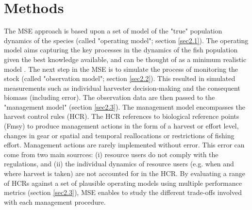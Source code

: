 \documentclass[12pt,oneline,a4paper,numbib]{ouparticle}
\numberwithin{equation}{subsection} %
\begin{document}
\section{Methods}
\label{sec2}
The MSE approach is based upon a set of model of the "true" population dynamics of the species (called "operating model"; section \ref{sec2.1}). The operating model aims capturing the key processes in the dynamics of the fish population given the best knowledge available, and can be thought of as a minimum realistic model \cite{Punt1995}. The next step in the MSE is to simulate the process of monitoring the stock (called "observation model"; section \ref{sec2.2}). This resulted in simulated measurements such as individual harvester decision-making and the consequent biomass (including error). The observation data are then passed to the "management model" (section \ref{sec2.3}). The management model encompasses the harvest control rules (HCR). The HCR references to biological reference points (Fmsy) to produce management actions in the form of a harvest or effort level, changes in gear or spatial and temporal reallocations or restrictions of fishing effort. Management actions are rarely implemented without error. This error can come from two main sourrces: (i) resource users do not comply with the regulations, and (ii) the individual dynamics of resource users (e.g. when and where harvest is taken) are not accounted for in the HCR. By evaluating a range of HCRs against a set of plausible operating models using multiple performance metrics (section \ref{sec2.3}), MSE enables to study the different trade-offs involved with each management procedure.  
\end{document}
